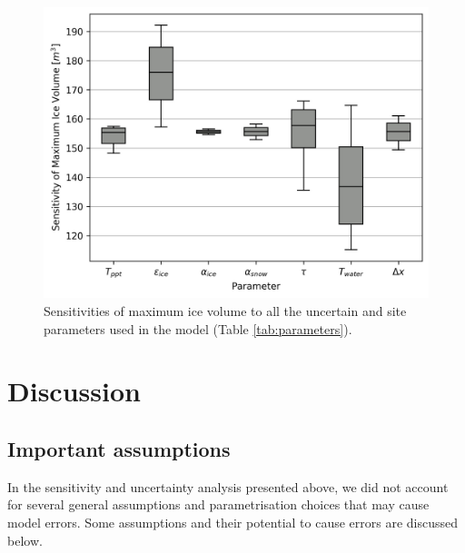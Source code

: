 \documentclass[utf8]{frontiersSCNS} %
\begin{document}
\begin{figure} 
    \begin{center} 
    \includegraphics[width=10 cm]{Figures/sensitivities.jpg} 
\end{center}
\caption{Sensitivities of maximum ice volume to all the uncertain and site parameters used in the model (Table
\ref{tab:parameters}). } 
\label{fig:sensitivity} 
\end{figure}
 
\section{Discussion}
\subsection{Important assumptions}\label{section:assumptions} In the sensitivity and uncertainty analysis presented
above, we did not account for several general assumptions and parametrisation choices that may cause model errors.
Some assumptions and their potential to cause errors are discussed below.
\end{document}
